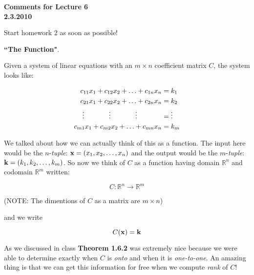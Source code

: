 \documentclass[12pt]{article}
\begin{document}
\begin{center}
{\large \bf Comments for Lecture 6}\\
\bf{2.3.2010}
\end{center}

Start homework 2 as soon as possible!

\begin{center}
{\bf ``The Function"}.  
\end{center}

\noindent Given a system of linear equations with an $m \times n$ coefficient matrix $C$, the system looks like:

\begin{align*}
c_{11} x_1 + c_{12} x_2 + \ldots + c_{1n} x_n &= k_1 \\
c_{21} x_1 + c_{22} x_2 + \ldots + c_{2n} x_n &= k_2 \\
\vdots \hspace{3pc} \vdots \hspace{3pc} \vdots \hspace{3pc} &= \vdots \\
c_{m1} x_1 + c_{m2} x_2 + \ldots + c_{mn} x_n &= k_m \\
\end{align*}

\noindent We talked about how we can actually think of this as a function.  The input here would be the $n$-{\it tuple}: ${\bf x} = (x_1,x_2,\ldots,x_n)$ and the output would be the $m$-{\it tuple}: ${\bf k} = (k_1,k_2,\ldots,k_m)$.  So now we think of $C$ as a function having domain $\mathbb{R}^n$ and codomain $\mathbb{R}^m$ written:

\[C: \mathbb{R}^n \rightarrow \mathbb{R}^m \]

\noindent (NOTE: The dimentions of $C$ as a matrix are $m\times n$)

\noindent and we write

\[C({\bf x})={\bf k} \] 

\noindent As we discussed in class {\bf Theorem 1.6.2} was extremely nice because we were able to determine exactly when $C$ is {\it onto} and when it is {\it one-to-one}.  An amazing thing is that we can get this information for free when we compute {\it rank} of $C$!
\end{document}
